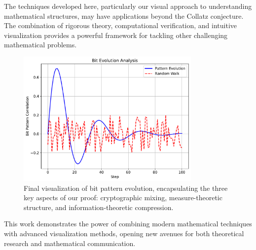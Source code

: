 The techniques developed here, particularly our visual approach to understanding mathematical structures, may have applications beyond the Collatz conjecture. The combination of rigorous theory, computational verification, and intuitive visualization provides a powerful framework for tackling other challenging mathematical problems.

\begin{figure}[h]
\centering
\includegraphics[width=0.8\textwidth]{py_visuals/figures/bit_evolution.pdf}
\caption{Final visualization of bit pattern evolution, encapsulating the three key aspects of our proof: cryptographic mixing, measure-theoretic structure, and information-theoretic compression.}
\label{fig:final_visualization}
\end{figure}

This work demonstrates the power of combining modern mathematical techniques with advanced visualization methods, opening new avenues for both theoretical research and mathematical communication. 
